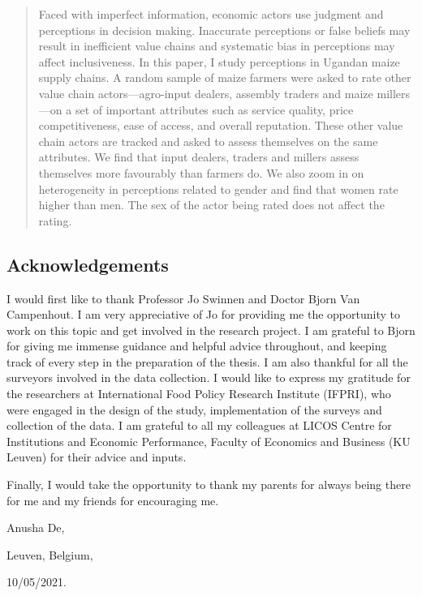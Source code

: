 \documentclass[12pt,english]{article}\usepackage[]{graphicx}\usepackage[]{color}
\begin{document}
\begin{abstract}
\begin{onehalfspace}
Faced with imperfect information, economic actors use judgment and
perceptions in decision making. Inaccurate perceptions or false beliefs
may result in inefficient value chains and systematic bias in perceptions
may affect inclusiveness. In this paper, I study perceptions in Ugandan
maize supply chains. A random sample of maize farmers were asked to
rate other value chain actors---agro-input dealers, assembly traders
and maize millers---on a set of important attributes such as service
quality, price competitiveness, ease of access, and overall reputation.
These other value chain actors are tracked and asked to assess themselves
on the same attributes. We find that input dealers, traders and millers
assess themselves more favourably than farmers do. We also zoom in
on heterogeneity in perceptions related to gender and find that women
rate higher than men. The sex of the actor being rated does not affect
the rating.
\end{onehalfspace}
\end{abstract}
\begin{onehalfspace}


\newpage{}

\section*{Acknowledgements}
\end{onehalfspace}

I would first like to thank Professor Jo Swinnen and Doctor Bjorn
Van Campenhout. I am very appreciative of Jo for providing me the
opportunity to work on this topic and get involved in the research
project. I am grateful to Bjorn for giving me immense guidance and
helpful advice throughout, and keeping track of every step in the
preparation of the thesis. I am also thankful for all the surveyors
involved in the data collection. I would like to express my gratitude
for the researchers at International Food Policy Research Institute
(IFPRI), who were engaged in the design of the study, implementation
of the surveys and collection of the data. I am grateful to all my
colleagues at LICOS Centre for Institutions and Economic Performance,
Faculty of Economics and Business (KU Leuven) for their advice and
inputs. 

Finally, I would take the opportunity to thank my parents for always
being there for me and my friends for encouraging me. 
\begin{singlespace}
\begin{flushright}
Anusha De, 
\par\end{flushright}

\begin{flushright}
Leuven, Belgium,
\par\end{flushright}

\begin{flushright}
10/05/2021.
\par\end{flushright}
\end{singlespace}
\end{document}
